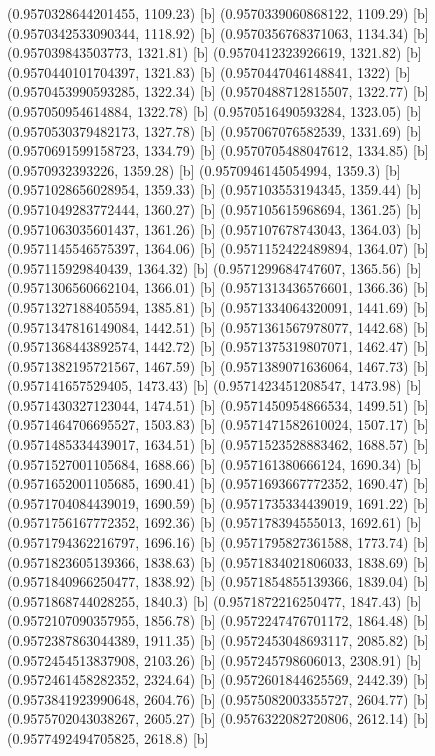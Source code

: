 {{{(0.9570328644201455, 1109.23) [b] 
(0.9570339060868122, 1109.29) [b] 
(0.9570342533090344, 1118.92) [b] 
(0.9570356768371063, 1134.34) [b] 
(0.957039843503773, 1321.81) [b] 
(0.9570412323926619, 1321.82) [b] 
(0.9570440101704397, 1321.83) [b] 
(0.9570447046148841, 1322) [b] 
(0.9570453990593285, 1322.34) [b] 
(0.9570488712815507, 1322.77) [b] 
(0.957050954614884, 1322.78) [b] 
(0.9570516490593284, 1323.05) [b] 
(0.9570530379482173, 1327.78) [b] 
(0.957067076582539, 1331.69) [b] 
(0.9570691599158723, 1334.79) [b] 
(0.9570705488047612, 1334.85) [b] 
(0.9570932393226, 1359.28) [b] 
(0.9570946145054994, 1359.3) [b] 
(0.9571028656028954, 1359.33) [b] 
(0.957103553194345, 1359.44) [b] 
(0.9571049283772444, 1360.27) [b] 
(0.957105615968694, 1361.25) [b] 
(0.9571063035601437, 1361.26) [b] 
(0.957107678743043, 1364.03) [b] 
(0.9571145546575397, 1364.06) [b] 
(0.9571152422489894, 1364.07) [b] 
(0.957115929840439, 1364.32) [b] 
(0.9571299684747607, 1365.56) [b] 
(0.9571306560662104, 1366.01) [b] 
(0.9571313436576601, 1366.36) [b] 
(0.9571327188405594, 1385.81) [b] 
(0.9571334064320091, 1441.69) [b] 
(0.9571347816149084, 1442.51) [b] 
(0.9571361567978077, 1442.68) [b] 
(0.9571368443892574, 1442.72) [b] 
(0.9571375319807071, 1462.47) [b] 
(0.9571382195721567, 1467.59) [b] 
(0.9571389071636064, 1467.73) [b] 
(0.957141657529405, 1473.43) [b] 
(0.9571423451208547, 1473.98) [b] 
(0.9571430327123044, 1474.51) [b] 
(0.9571450954866534, 1499.51) [b] 
(0.9571464706695527, 1503.83) [b] 
(0.9571471582610024, 1507.17) [b] 
(0.9571485334439017, 1634.51) [b] 
(0.9571523528883462, 1688.57) [b] 
(0.9571527001105684, 1688.66) [b] 
(0.957161380666124, 1690.34) [b] 
(0.9571652001105685, 1690.41) [b] 
(0.9571693667772352, 1690.47) [b] 
(0.9571704084439019, 1690.59) [b] 
(0.9571735334439019, 1691.22) [b] 
(0.9571756167772352, 1692.36) [b] 
(0.957178394555013, 1692.61) [b] 
(0.9571794362216797, 1696.16) [b] 
(0.9571795827361588, 1773.74) [b] 
(0.9571823605139366, 1838.63) [b] 
(0.9571834021806033, 1838.69) [b] 
(0.9571840966250477, 1838.92) [b] 
(0.9571854855139366, 1839.04) [b] 
(0.9571868744028255, 1840.3) [b] 
(0.9571872216250477, 1847.43) [b] 
(0.9572107090357955, 1856.78) [b] 
(0.9572247476701172, 1864.48) [b] 
(0.9572387863044389, 1911.35) [b] 
(0.9572453048693117, 2085.82) [b] 
(0.9572454513837908, 2103.26) [b] 
(0.957245798606013, 2308.91) [b] 
(0.9572461458282352, 2324.64) [b] 
(0.9572601844625569, 2442.39) [b] 
(0.9573841923990648, 2604.76) [b] 
(0.9575082003355727, 2604.77) [b] 
(0.9575702043038267, 2605.27) [b] 
(0.9576322082720806, 2612.14) [b] 
(0.9577492494705825, 2618.8) [b] 
}}}
